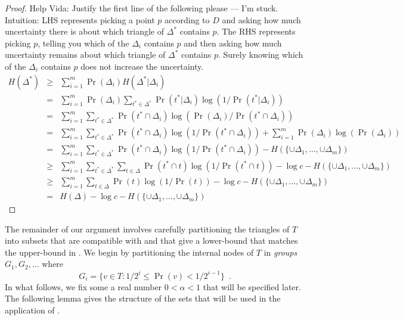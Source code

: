 \documentclass[charterfonts,lotsofwhite]{patmorin}
\begin{document}
\begin{proof} Help Vida: Justify the first line of the following please 
--- I'm stuck.
Intuition: LHS represents picking a point $p$ according to $D$ and
asking how much uncertainty there is about which triangle of
$\Delta^*$ contains $p$.  The RHS represents picking $p$, telling you
which of the $\Delta_i$ contains $p$ and then asking how much
uncertainty remains about which triangle of $\Delta^*$ contains $p$.
Surely knowing which of the $\Delta_i$ contains $p$ does not increase
the uncertainty.
\begin{eqnarray*}
   H(\Delta^*) 
     & \ge & \sum_{i=1}^m \Pr(\Delta_i)H(\Delta^*|\Delta_i) \\
     &  =  & \sum_{i=1}^m \Pr(\Delta_i)\sum_{t^*\in\Delta^*}
       \Pr(t^*|\Delta_i)\log(1/\Pr(t^*|\Delta_i)) \\
     &  =  & \sum_{i=1}^m \sum_{t^*\in\Delta^*}
       \Pr(t^*\cap\Delta_i)\log(\Pr(\Delta_i)/\Pr(t^*\cap\Delta_i)) \\
     &  =  & \sum_{i=1}^m \sum_{t^*\in\Delta^*}
       \Pr(t^*\cap\Delta_i)\log(1/\Pr(t^*\cap\Delta_i)) 
        + \sum_{i=1}^m \Pr(\Delta_i)\log(\Pr(\Delta_i)) \\
     &  =  & \sum_{i=1}^m \sum_{t^*\in\Delta^*}
       \Pr(t^*\cap\Delta_i)\log(1/\Pr(t^*\cap\Delta_i)) 
        - H(\{\cup\Delta_1,\ldots,\cup\Delta_m\}) \\
     & \ge  & \sum_{i=1}^m \sum_{t^*\in\Delta^*}\sum_{t\in\Delta}
       \Pr(t^*\cap t)\log(1/\Pr(t^*\cap t)) 
        -\log c - H(\{\cup\Delta_1,\ldots,\cup\Delta_m\}) \\
     & \ge  & \sum_{i=1}^m \sum_{t\in\Delta}
       \Pr(t)\log(1/\Pr(t)) 
        -\log c - H(\{\cup\Delta_1,\ldots,\cup\Delta_m\}) \\
     &  =  & H(\Delta) -\log c - H(\{\cup\Delta_1,\ldots,\cup\Delta_m\})
\end{eqnarray*}
\end{proof}


The remainder of our argument involves carefully partitioning the
triangles of $T$ into subsets that are compatible with 
and that give a lower-bound that matches the upper-bound in
.
We begin by partitioning the internal nodes of $T$ in
\emph{groups} $G_1,G_2,\ldots$ where
\[
	G_i = \{v\in T : 1/2^{i} \le \Pr(v) < 1/2^{i-1} \} \enspace .
\]
In what follows, we fix some a real number $0< \alpha < 1$ that will be
specified later.   The following lemma gives the structure of the sets
that will be used in the application of .
\end{document}
